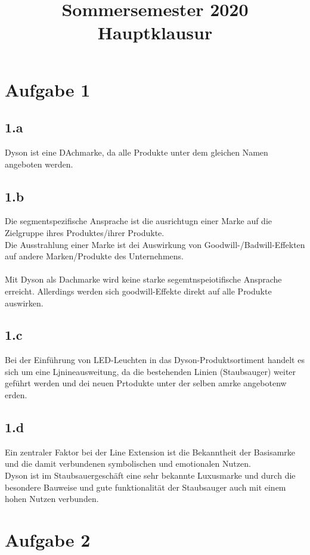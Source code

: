 

\title{Sommersemester 2020 Hauptklausur}
\maketitle


\section{Aufgabe 1}
\subsection{1.a}
    Dyson ist eine DAchmarke, da alle Produkte unter dem gleichen Namen angeboten werden.

\subsection{1.b}
    Die segmentspezifische Ansprache ist die ausrichtugn einer Marke auf die Zielgruppe ihres Produktes/ihrer Produkte. \\
    Die Ausstrahlung einer Marke ist dei Auswirkung von Goodwill-/Badwill-Effekten auf andere Marken/Produkte des Unternehmens. \\
    \ \\
    Mit Dyson als Dachmarke wird keine starke segemtnspeiotifische Ansprache erreicht. Allerdings werden sich goodwill-Effekte direkt auf alle Produkte auswirken.

\subsection{1.c}
    Bei der Einführung von LED-Leuchten in das Dyson-Produktsortiment handelt es sich um eine Ljnineausweitung, da die bestehenden Linien (Staubsauger) weiter geführt werden und dei neuen Prtodukte unter der selben amrke angebotenw erden.

\subsection{1.d}
    Ein zentraler Faktor bei der Line Extension ist die Bekanntheit der Basisamrke und die damit verbundenen symbolischen und emotionalen Nutzen. \\
    Dyson ist im Staubsauergeschäft eine sehr bekannte Luxusmarke und durch die besondere Bauweise und gute funktionalität der Staubsauger auch mit einem hohen Nutzen verbunden.

\section{Aufgabe 2}
